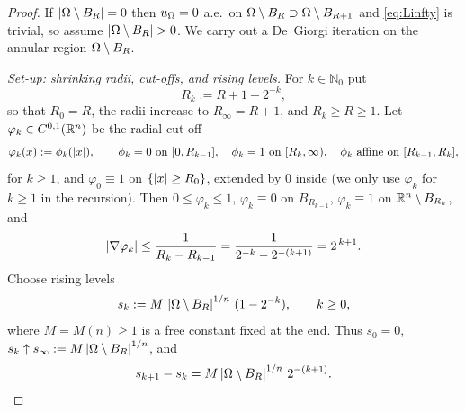 \begin{proof}
If $\left|\Omega\setminus B_R\right|=0$ then $u_\Omega=0$ a.e.\ on
$\Omega\setminus B_R\supset\Omega\setminus B_{R+1}$ and \eqref{eq:Linfty} is
trivial, so assume $\abs{\Om\setminus B_R}>0$. We carry out a De~Giorgi
iteration on the annular region $\Omega\setminus B_R$.

\smallskip
\emph{Set-up: shrinking radii, cut-offs, and rising levels.}
For $k\in\mathbb N_0$ put
\[
   R_k:=R+1-2^{-k},
\]
so that $R_0=R$, the radii increase to $R_\infty=R+1$, and
$R_k\ge R\ge1$. Let $\varphi_k\in C^{0,1}(\mathbb{R}^n)$ be the radial cut-off
\[
   \varphi_k(x):=\phi_k(\left|x\right|),\qquad
   \phi_k=0\ \text{on}\ [0,R_{k-1}],\quad
   \phi_k=1\ \text{on}\ [R_k,\infty),\quad
   \phi_k\ \text{affine on}\ [R_{k-1},R_k],
\]
for $k\ge1$, and $\varphi_0\equiv1$ on $\{\left|x\right|\ge R_0\}$, extended by
$0$ inside (we only use $\varphi_k$ for $k\ge1$ in the recursion). Then
$0\le\varphi_k\le1$, $\varphi_k\equiv0$ on $B_{R_{k-1}}$, $\varphi_k\equiv1$
on $\mathbb{R}^n\setminus B_{R_k}$, and
\[
   \left|\nabla\varphi_k\right|\le\frac1{R_k-R_{k-1}}
   =\frac1{2^{-k}-2^{-(k+1)}}=2^{\,k+1}.
\]
Choose rising levels
\[
   s_k:=M\,\left|\Omega\setminus B_R\right|^{1/n}\,(1-2^{-k}),\qquad k\ge0,
\]
where $M=M(n)\ge1$ is a free constant fixed at the end. Thus $s_0=0$,
$s_k\uparrow s_\infty:=M\left|\Omega\setminus B_R\right|^{1/n}$, and
\begin{equation}\label{eq:s-diff}
   s_{k+1}-s_k=M\left|\Omega\setminus B_R\right|^{1/n}\,2^{-(k+1)} .
\end{equation}


\end{proof}
